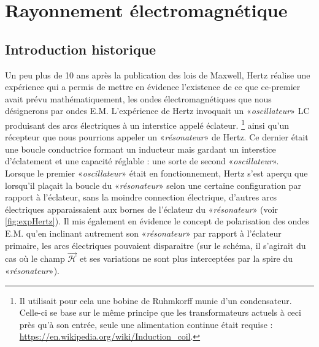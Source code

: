 % 
% 
\chapter{Rayonnement électromagnétique}
\section{Introduction historique}
Un peu plus de 10 ans après la publication des lois de Maxwell, Hertz réalise une expérience qui a permis de mettre en évidence l'existence de ce que ce-premier avait prévu mathématiquement, les ondes électromagnétiques que nous désignerons par ondes E.M. L'expérience de Hertz invoquait un «\textit{oscillateur}» LC produisant des arcs électriques à un interstice appelé éclateur. \footnote{Il utilisait pour cela une bobine de Ruhmkorff munie d'un condensateur. Celle-ci se base sur le même principe que les transformateurs actuels à ceci près qu'à son entrée, seule une alimentation continue était requise : \url{https://en.wikipedia.org/wiki/Induction_coil}.} ainsi qu'un récepteur que nous pourrions appeler un «\textit{résonateur}» de Hertz. Ce dernier était une boucle conductrice formant un inducteur mais gardant un interstice d'éclatement et une capacité réglable : une sorte de second «\textit{oscillateur}». \\Lorsque le premier «\textit{oscillateur}» était en fonctionnement, Hertz s'est aperçu que lorsqu'il plaçait la boucle du «\textit{résonateur}» selon une certaine configuration par rapport à l'éclateur, sans la moindre connection électrique, d'autres arcs électriques apparaissaient aux bornes de l'éclateur du «\textit{résonateur}» (voir \ref{fig:expHertz}). Il mis également en évidence le concept de polarisation des ondes E.M. qu'en inclinant autrement son «\textit{résonateur}» par rapport à l'éclateur primaire, les arcs électriques pouvaient disparaitre (sur le schéma, il s'agirait du cas où le champ $\vec{\mathcal{H}}$ et ses variations ne sont plus interceptées par la spire du «\textit{résonateur}»).

